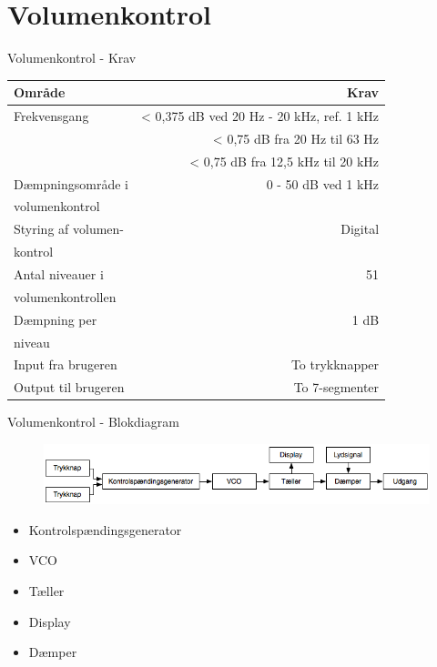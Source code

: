 \section{Volumenkontrol}

\begin{frame}{Volumenkontrol - Krav}
\scriptsize{
\begin{table}[h]
\centering
\begin{tabular}{l|r}
\hline\hline
Område & Krav \\
\hline\hline
Frekvensgang & < 0,375 dB ved 20 Hz - 20 kHz, ref. 1 kHz \\
& < 0,75 dB fra 20 Hz til 63 Hz \\
& < 0,75 dB fra 12,5 kHz til 20 kHz \\[4pt]
Dæmpningsområde i & 0 - 50 dB ved 1 kHz \\
volumenkontrol & \\[4pt]
Styring af volumen- & Digital \\
kontrol & \\[4pt]
Antal niveauer i & 51 \\
volumenkontrollen & \\[4pt]
Dæmpning per & 1 dB \\
niveau & \\[4pt]
Input fra brugeren & To trykknapper \\[4pt]
Output til brugeren & To 7-segmenter \\
\hline\hline
\end{tabular}
\end{table}}
\end{frame}

\begin{frame}{Volumenkontrol - Blokdiagram}
\begin{figure}[h]
\centering
\includegraphics[scale=0.4]{images/blokdiagram-volumenkontrol.png}
\end{figure}

\begin{itemize}
\item Kontrolspændingsgenerator
\item VCO
\item Tæller
\item Display
\item Dæmper
\end{itemize}
\end{frame}

